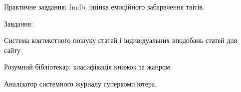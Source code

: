 % 
% 
% 
% 
% 



Практичне завдання: Imdb, оцінка емоційного забарвлення твітів.

Завдання:

Система контекстного пошуку статей і індивідуальних вподобань статей для сайту

Розумний бібліотекар: класифікація книжок за жанром.

Аналізатор системного журналу суперкомп'ютера.